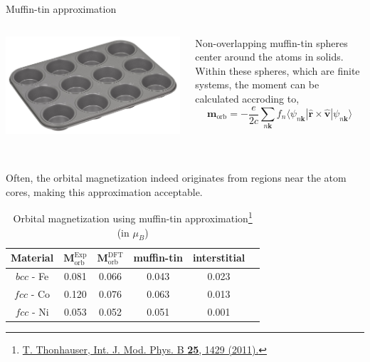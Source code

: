 \documentclass{beamer}
\begin{document}
    \begin{frame}{Muffin-tin approximation}
      \begin{columns}
        \begin{column}{0.27\textwidth}
          \begin{center}
            \includegraphics[width=\textwidth]{figure/muffin-tin.jpg}
          \end{center}
        \end{column}
        \begin{column}{0.7\textwidth}
        \begin{block}{}
          Non-overlapping muffin-tin spheres center around the atoms in solids. Within these spheres, which are finite systems, the moment can be calculated accroding to, 
          \begin{equation}
            \bm{m}_{\text{orb}} = -\frac{e}{2c}\sum_{n\bm{k}} f_n \langle\psi_{n\bm{k}}|\widehat{\bm{r}}\times\widehat{\bm{v}}|\psi_{n\bm{k}}\rangle
          \end{equation}
        \end{block}
        \end{column}
      \end{columns}
      \ \\
      
      Often, the orbital magnetization indeed originates from regions near the atom cores, making this approximation acceptable.
      
      \begin{table}\scriptsize
        \caption{\scriptsize Orbital magnetization using muffin-tin approximation\footnote{\tiny \href{https://doi.org/10.1142/S0217979211058912}{T. Thonhauser, Int. J. Mod. Phys. B \textbf{25}, 1429 (2011).}} (in \(\mu_B\))}
        \begin{tabular}{c|ccccc}
          \toprule
          Material & \(\bm{M}_{\text{orb}}^{\text{Exp}}\) & \(\bm{M}_{\text{orb}}^{\text{DFT}}\) & muffin-tin & interstitial\\
          \midrule
          \(bcc\) - Fe & 0.081 & 0.066 & 0.043 & 0.023\\
          \(fcc\) - Co & 0.120 & 0.076 & 0.063 & 0.013\\
          \(fcc\) - Ni & 0.053 & 0.052 & 0.051 & 0.001\\
          \bottomrule
        \end{tabular}
      \end{table}
    \end{frame}
\end{document}
